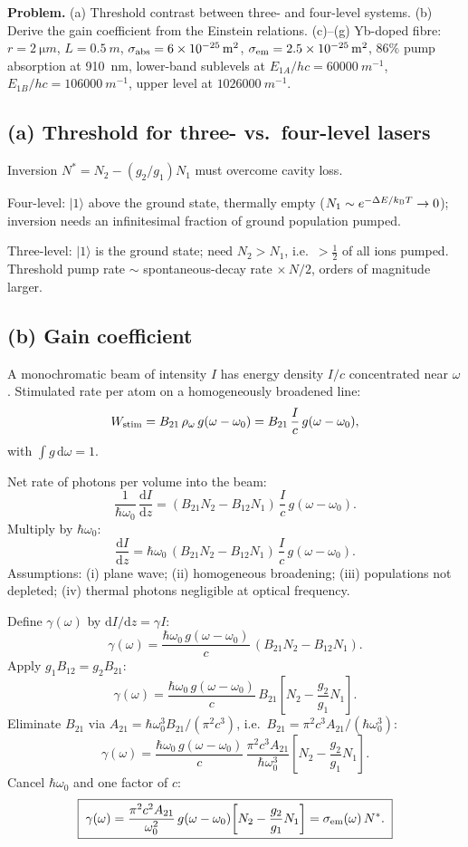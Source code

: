 \documentclass[11pt]{article}
\newcommand{\de}{\mathrm{d}}
\begin{document}
\textbf{Problem.} (a) Threshold contrast between three- and four-level systems. (b) Derive the gain coefficient from the Einstein relations. (c)--(g) Yb-doped fibre: $r=\SI{2}{\micro m}$, $L=\SI{0.5}{m}$, $\sigma_{\rm abs}=\SI{6e-25}{m^2}$, $\sigma_{\rm em}=\SI{2.5e-25}{m^2}$, $86\%$ pump absorption at \SI{910}{nm}, lower-band sublevels at $E_{1A}/hc=\SI{60000}{m^{-1}}$, $E_{1B}/hc=\SI{106000}{m^{-1}}$, upper level at $\SI{1026000}{m^{-1}}$.

\subsection*{(a) Threshold for three- vs.\ four-level lasers}

Inversion $N^*=N_2-(g_2/g_1)N_1$ must overcome cavity loss.

Four-level: $|1\rangle$ above the ground state, thermally empty ($N_1\sim e^{-\Delta E/k_{\rm B}T}\to 0$); inversion needs an infinitesimal fraction of ground population pumped.

Three-level: $|1\rangle$ is the ground state; need $N_2>N_1$, i.e.\ $>\!\tfrac12$ of all ions pumped. Threshold pump rate $\sim$ spontaneous-decay rate $\times\,N/2$, orders of magnitude larger.

\subsection*{(b) Gain coefficient}

A monochromatic beam of intensity $I$ has energy density $I/c$ concentrated near $\omega$. Stimulated rate per atom on a homogeneously broadened line:
\[
W_{\rm stim}=B_{21}\,\rho_\omega\,g(\omega-\omega_0)=B_{21}\,\frac{I}{c}\,g(\omega-\omega_0),
\]
with $\int g\,\de\omega=1$.

Net rate of photons per volume into the beam:
\[
\frac{1}{\hbar\omega_0}\,\frac{\de I}{\de z}=(B_{21}N_2-B_{12}N_1)\,\frac{I}{c}\,g(\omega-\omega_0).
\]
Multiply by $\hbar\omega_0$:
\[
\frac{\de I}{\de z}=\hbar\omega_0\,(B_{21}N_2-B_{12}N_1)\,\frac{I}{c}\,g(\omega-\omega_0).
\]
Assumptions: (i) plane wave; (ii) homogeneous broadening; (iii) populations not depleted; (iv) thermal photons negligible at optical frequency.

Define $\gamma(\omega)$ by $\de I/\de z=\gamma I$:
\[
\gamma(\omega)=\frac{\hbar\omega_0\,g(\omega-\omega_0)}{c}\,(B_{21}N_2-B_{12}N_1).
\]
Apply $g_1 B_{12}=g_2 B_{21}$:
\[
\gamma(\omega)=\frac{\hbar\omega_0\,g(\omega-\omega_0)}{c}\,B_{21}\!\left[N_2-\frac{g_2}{g_1}N_1\right].
\]
Eliminate $B_{21}$ via $A_{21}=\hbar\omega_0^{3}B_{21}/(\pi^{2}c^{3})$, i.e.\ $B_{21}=\pi^{2}c^{3}A_{21}/(\hbar\omega_0^{3})$:
\[
\gamma(\omega)=\frac{\hbar\omega_0\,g(\omega-\omega_0)}{c}\,\frac{\pi^{2}c^{3}A_{21}}{\hbar\omega_0^{3}}\!\left[N_2-\frac{g_2}{g_1}N_1\right].
\]
Cancel $\hbar\omega_0$ and one factor of $c$:
\begin{equation}
\boxed{\;\gamma(\omega)=\frac{\pi^{2}c^{2}A_{21}}{\omega_0^{2}}\,g(\omega-\omega_0)\!\left[N_2-\frac{g_2}{g_1}N_1\right]=\sigma_{\rm em}(\omega)\,N^{*}.\;}
\label{eq:gain-final}
\end{equation}
\end{document}
